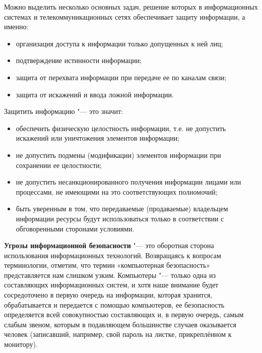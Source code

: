 Можно выделить несколько основных задач, решение которых в информационных системах и телекоммуникационных сетях обеспечивает 
защиту информации, а именно:
\begin{itemize}
    \item организация доступа к информации только допущенных к ней лиц;
    \item подтверждение истинности информации;
    \item защита от перехвата информации при передаче ее по каналам связи;
    \item защита от искажений и ввода ложной информации.
\end{itemize}
Защитить информацию "---  это значит:
\begin{itemize}
    \item обеспечить физическую целостность информации, т.е. не допустить искажений или уничтожения элементов информации;
    \item не допустить подмены (модификации) элементов информации при сохранении ее целостности;
    \item не допустить несанкционированного получения информации лицами или процессами, не имеющими на это соответствующих 
    полномочий;
    \item быть уверенным в том, что передаваемые (продаваемые) владельцем информации ресурсы будут использоваться только в 
    соответствии с обговоренными сторонами условиями.
\end{itemize}

\textbf{Угрозы информационной безопасности} "---  это оборотная сторона использования информационных технологий. Возвращаясь к вопросам 
терминологии, отметим, что термин «компьютерная безопасность» представляется нам слишком узким. Компьютеры "---  только одна из 
составляющих информационных систем, и хотя наше внимание будет сосредоточено в первую очередь на информации, которая 
хранится, обрабатывается и передается с помощью компьютеров, ее безопасность определяется всей совокупностью составляющих и, 
в первую очередь, самым слабым звеном, которым в подавляющем большинстве случаев оказывается человек (записавший, например, 
свой пароль на листке, прикреплённом к монитору). \cite{studfile}
\newpage
